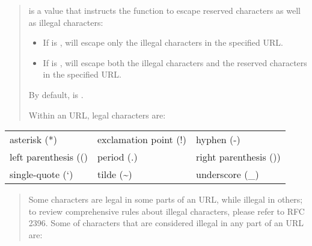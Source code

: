 \documentclass[letterpaper,10pt,english,openany,oneside]{sphinxmanual}
\begin{document}
\begin{quote}

 is a  value that instructs the
 function to escape reserved characters as well as illegal
characters:
\begin{itemize}
\item {} 
If  is ,  will escape
only the illegal characters in the specified URL.

\item {} 
If  is ,  will escape
both the illegal characters and the reserved characters in the
specified URL.

\end{itemize}

By default,  is .

Within an URL, legal characters are:
\end{quote}


\begin{savenotes}\sphinxattablestart
\centering
\begin{tabulary}{\linewidth}[t]{|T|T|T|}
\hline
{}\relax &\relax &\relax \\
\hline
asterisk (*)
&
exclamation point (!)
&
hyphen (-)
\\
\hline
left parenthesis (()
&
period (.)
&
right parenthesis ())
\\
\hline
single-quote (‘)
&
tilde (\textasciitilde{})
&
underscore (\_)
\\
\hline
\end{tabulary}
\par
\sphinxattableend\end{savenotes}
\begin{quote}

Some characters are legal in some parts of an URL, while illegal in
others; to review comprehensive rules about illegal characters,
please refer to RFC 2396. Some  of characters that are
considered illegal in any part of an URL are:
\end{quote}
\end{document}
